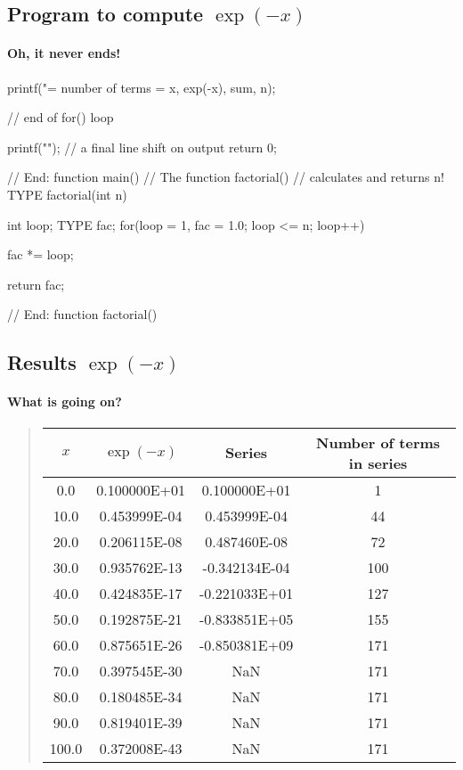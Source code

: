 \documentclass[%
oneside,                 %
final,                   %
10pt]{article}
\begin{document}
{{{{{{{%
\subsection{Program to compute $\exp{(-x)}$}


\paragraph{Oh, it never ends!}
\bcppcod
      printf("\nx = %
              number of terms = %
              x, exp(-x), sum, n);
   } // end of for() loop

   printf("\n");           // a final line shift on output
   return 0;
} // End: function main()
//     The function factorial()
//     calculates and returns n!
TYPE factorial(int n)
{
   int  loop;
   TYPE fac;
   for(loop = 1, fac = 1.0; loop <= n; loop++)  {
      fac *= loop;

   return fac;
} // End: function factorial()
\ecppcod



\subsection{Results $\exp{(-x)}$}


\paragraph{What is going on?}


\begin{quote}
\begin{tabular}{cccc}
\hline
\multicolumn{1}{c}{ $x$ } & \multicolumn{1}{c}{ $\exp{(-x)}$ } & \multicolumn{1}{c}{ Series } & \multicolumn{1}{c}{ Number of terms in series } \\
\hline
0.0   & 0.100000E+01 & 0.100000E+01  & 1                         \\
10.0  & 0.453999E-04 & 0.453999E-04  & 44                        \\
20.0  & 0.206115E-08 & 0.487460E-08  & 72                        \\
30.0  & 0.935762E-13 & -0.342134E-04 & 100                       \\
40.0  & 0.424835E-17 & -0.221033E+01 & 127                       \\
50.0  & 0.192875E-21 & -0.833851E+05 & 155                       \\
60.0  & 0.875651E-26 & -0.850381E+09 & 171                       \\
70.0  & 0.397545E-30 & NaN           & 171                       \\
80.0  & 0.180485E-34 & NaN           & 171                       \\
90.0  & 0.819401E-39 & NaN           & 171                       \\
100.0 & 0.372008E-43 & NaN           & 171                       \\
\hline
\end{tabular}
\end{quote}

}}}}}}
\end{document}
